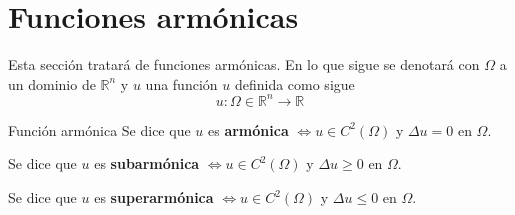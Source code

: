 \section{Funciones armónicas}
Esta sección tratará de funciones armónicas. En lo que sigue se denotará con $\Omega$ a un dominio de $\mathbb{R}^n$ y $u$ una función $u$ definida como sigue
$$u:\Omega \in \mathbb{R}^n \longrightarrow \mathbb{R}$$

\begin{definition}{Función armónica}
Se dice que $u$ es \textbf{armónica} $\iff u\in C^2(\Omega)$ y $\Delta u = 0$ en $\Omega$.

\noindent Se dice que $u$ es \textbf{subarmónica} $\iff u\in C^2(\Omega)$ y $\Delta u \ge 0$ en $\Omega$.

\noindent Se dice que $u$ es \textbf{superarmónica} $\iff u\in C^2(\Omega)$ y $\Delta u \le 0$ en $\Omega$.
\end{definition}

